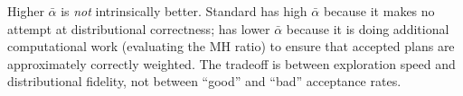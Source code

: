 \begin{remark}
\label{rem:accept-not-quality}
Higher $\bar\alpha$ is \emph{not} intrinsically better.
Standard \sburst{} has high $\bar\alpha$ because it makes no attempt at
distributional correctness; \sbf{} has lower $\bar\alpha$ because it is
doing additional computational work (evaluating the MH ratio) to ensure
that accepted plans are approximately correctly weighted.
The tradeoff is between exploration speed and distributional fidelity,
not between ``good'' and ``bad'' acceptance rates.
\end{remark}
